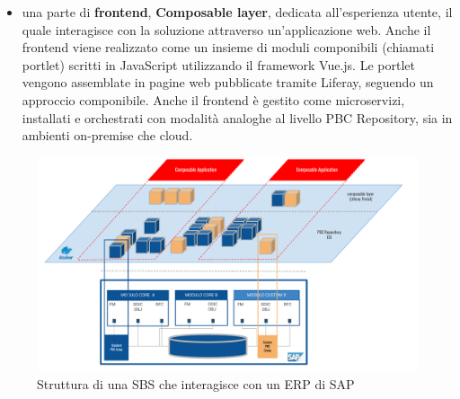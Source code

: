 \begin{itemize}
\begin{itemize}
            prezzi dei materiali PBC 0217 MATPRICELIST e l’unità di misura dei materiali PBC 0222 UNITOFMEASURE.
            In uno scenario on-premise (installazione presso il data-center del cliente), i
            microservizi sono orchestrati tramite Docker Compose. In uno scenario on-cloud, i
            microservizi vengono gestiti tramite Kubernetes\footnote{https://kubernetes.io}.
        \end{itemize}
    \item una parte di \textbf{frontend}, \textbf{Composable layer}, dedicata all’esperienza utente, il quale interagisce con
    la soluzione attraverso un'applicazione web.
    Anche il frontend viene realizzato come un insieme di moduli componibili (chiamati portlet)
    scritti in JavaScript utilizzando il framework Vue.js. Le portlet vengono assemblate in pagine web
    pubblicate tramite Liferay, seguendo un approccio componibile. Anche il frontend è gestito come
    microservizi, installati e orchestrati con modalità analoghe al livello \ac{PBC} Repository, sia in
    ambienti on-premise che cloud.
\end{itemize}

\begin{figure}
    \centering
    \includegraphics[width=\linewidth]{figures/architetturaSBS_SAP.pdf}
    \caption{Struttura di una \ac{SBS} che interagisce con un \ac{ERP} di SAP}
    \label{fig:sbs-sap}
\end{figure}

